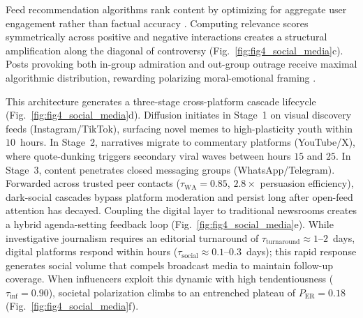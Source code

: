 \documentclass[a4paper,fleqn]{cas-dc}
\begin{document}
Feed recommendation algorithms rank content by optimizing for aggregate user engagement rather than factual accuracy \citep{vosoughi2018spread, crockett2017moral}. Computing relevance scores symmetrically across positive and negative interactions creates a structural amplification along the diagonal of controversy (Fig.~\ref{fig:fig4_social_media}c). Posts provoking both in-group admiration and out-group outrage receive maximal algorithmic distribution, rewarding polarizing moral-emotional framing \citep{brady2017emotion, crockett2017moral}.

This architecture generates a three-stage cross-platform cascade lifecycle (Fig.~\ref{fig:fig4_social_media}d). Diffusion initiates in Stage~1 on visual discovery feeds (Instagram/TikTok), surfacing novel memes to high-plasticity youth within $10$~hours. In Stage~2, narratives migrate to commentary platforms (YouTube/X), where quote-dunking triggers secondary viral waves between hours $15$ and $25$. In Stage~3, content penetrates closed messaging groups (WhatsApp/Telegram). Forwarded across trusted peer contacts ($\tau_{\text{WA}} = 0.85$, $2.8\times$ persuasion efficiency), dark-social cascades bypass platform moderation and persist long after open-feed attention has decayed. Coupling the digital layer to traditional newsrooms creates a hybrid agenda-setting feedback loop \citep{chadwick2017hybrid, harder2017intermedia} (Fig.~\ref{fig:fig4_social_media}e). While investigative journalism requires an editorial turnaround of $\tau_{\mathrm{turnaround}} \approx 1$--$2$~days, digital platforms respond within hours ($\tau_{\mathrm{social}} \approx 0.1$--$0.3$~days); this rapid response generates social volume that compels broadcast media to maintain follow-up coverage. When influencers exploit this dynamic with high tendentiousness ($\tau_{\mathrm{inf}} = 0.90$), societal polarization climbs to an entrenched plateau of $P_{\mathrm{ER}} = 0.18$ (Fig.~\ref{fig:fig4_social_media}f).
\end{document}
